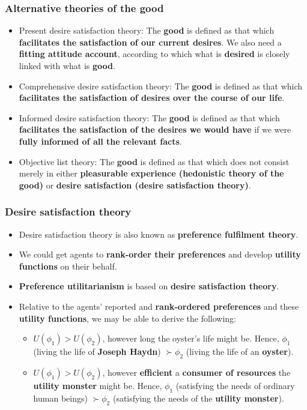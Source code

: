 \documentclass[11pt]{article}
\begin{document}
 \newpage
\subsubsection{Alternative theories of the good}
\label{sec:org6fb1763}
\begin{itemize}
\item Present desire satisfaction theory:
The \textbf{good} is defined as that which \textbf{facilitates the satisfaction of our current desires}. We also need a \textbf{fitting attitude account}, according to which what is \textbf{desired} is closely linked with what is \textbf{good}.
\item Comprehensive desire satisfaction theory:
The \textbf{good} is defined as that which \textbf{facilitates the satisfaction of desires over the course of our life}.
\item Informed desire satisfaction theory:
The \textbf{good} is defined as that which \textbf{facilitates the satisfaction of the desires we would have} if we were \textbf{fully informed of all the relevant facts}.
\item Objective list theory:
The \textbf{good} is defined as that which does not consist merely in either \textbf{pleasurable experience (hedonistic theory of the good)} or \textbf{desire satisfaction (desire satisfaction theory)}.
\end{itemize}
\subsubsection{Desire satisfaction theory}
\label{sec:org073620c}
\begin{itemize}
\item Desire satisfaction theory is also known as \textbf{preference fulfilment theory}.
\item We could get agents to \textbf{rank-order their preferences} and develop \textbf{utility functions} on their behalf.
\item \textbf{Preference utilitarianism} is based on \textbf{desire satisfaction theory}.
\item Relative to the agents' reported and \textbf{rank-ordered preferences} and these \textbf{utility functions}, we may be able to derive the following:
\begin{itemize}
\item \(U (\phi_1) > U (\phi_2)\), however long the oyster's life might be. Hence, \(\phi_1\) (living the life of \textbf{Joseph Haydn}) \(\succ \phi_2\) (living the life of an \textbf{oyster}).
\item \(U (\phi_1) > U (\phi_2)\), however \textbf{efficient} a \textbf{consumer of resources} the \textbf{utility monster} might be.
Hence, \(\phi_1\) (satisfying the needs of ordinary human beings) \(\succ \phi_2\) (satisfying the needs of the \textbf{utility monster}).
\end{itemize}
\end{itemize}
\end{document}
